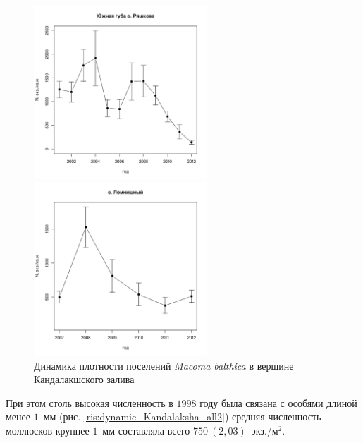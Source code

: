 \documentclass[12pt, a4paper]{disser}
\begin{document}
\begin{figure}[h]
	\begin{minipage}[b]{.46\linewidth}
	\begin{center}
		\includegraphics[width=65mm]{../White_Sea/Ryashkov_YuG/N_dynamic.pdf}
	\end{center}
	\end{minipage}
%
	\hfil %
%
	\begin{minipage}[b]{.46\linewidth}
	\begin{center}
		\includegraphics[width=65mm]{../White_Sea/Lomnishniy/N_dynamic.pdf}
	\end{center}
	\end{minipage}



	\caption{Динамика плотности поселений {\it Macoma balthica} в вершине Кандалакшского залива}
	\label{ris:dynamic_Kandalaksha_all}
	\end{figure}
При этом столь высокая численность в $1998$ году была связана с особями длиной менее $1$~мм (рис. \ref{ris:dynamic_Kandalaksha_all2}) \textemdash средняя численность моллюсков крупнее $1$~мм составляла всего $750~(2,03)$~экз./м$^2$.
\end{document}
